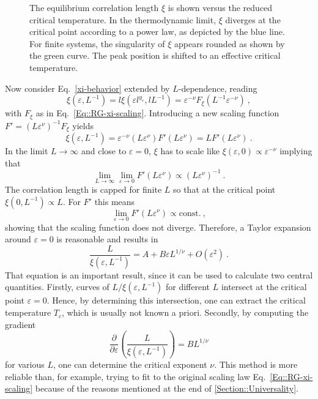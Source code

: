 	\begin{figure}
		\centering
		
		\caption{The equilibrium correlation length $\xi$ is shown versus the reduced critical temperature. In the thermodynamic limit, $\xi$ diverges at the critical point according to a power law, as depicted by the blue line. For finite systems, the singularity of $\xi$ appears rounded as shown by the green curve. The peak position is shifted to an effective critical temperature.}
		\label{xi-divergence-FS}
	\end{figure}
	Now consider Eq.~\eqref{xi-behavior} extended by $L$-dependence, reading
	\begin{equation}
		\xi(\varepsilon, L^{-1}) =	l \xi (\varepsilon l^{y_\varepsilon}, l L^{-1}) = \varepsilon^{-\nu} F_\xi (L^{-1} \varepsilon^{-\nu})~,
	\end{equation}
	with $F_\xi$ as in Eq.~\eqref{Eq::RG-xi-scaling}. Introducing a new scaling function $F' =	(L \varepsilon^\nu)^{-1} F_\xi$ yields
	\begin{equation}
		\xi(\varepsilon, L^{-1}) = \varepsilon^{-\nu} (L\varepsilon^\nu) F' (L \varepsilon^{\nu}) =	L	F'(L \varepsilon^\nu)~.
	\end{equation}
	In the limit $L \rightarrow \infty$ and close to $\varepsilon =	0$, $\xi$ has to scale like $\xi(\varepsilon, 0) \propto \varepsilon^{-\nu}$ implying that
	\begin{equation}
		\lim_{L \rightarrow \infty} \lim_{\varepsilon \rightarrow 0} F'(L \varepsilon^\nu) \propto (L \varepsilon^\nu)^{-1}~.
	\end{equation}
	The correlation length is capped for finite $L$ so that at the critical point $\xi(0, L^{-1}) \propto L$. For $F'$ this means
	\begin{equation}
		\lim_{\varepsilon \rightarrow 0} F'(L\varepsilon^\nu) \propto \text{const.}~,
	\end{equation}
	showing that the scaling function does not diverge. Therefore, a Taylor expansion around $\varepsilon =	0$ is reasonable and results in
	\begin{equation} \label{Equation::FSS-Scaling-L/xi}
		\frac{L}{\xi(\varepsilon, L^{-1})} =	A + B \varepsilon L^{1/\nu} + O(\varepsilon^2)~. 
	\end{equation}
	That equation is an important result, since it can be used to calculate two central quantities. Firstly, curves of $L/\xi(\varepsilon, L^{-1})$ for different $L$ intersect at the critical point $\varepsilon = 0$. Hence, by determining this intersection, one can extract the critical temperature $T_c$, which is usually not known a priori. Secondly, by computing the gradient
	\begin{equation}
		\frac{\partial}{\partial \varepsilon} \left(\frac{L}{\xi(\varepsilon, L^{-1})}\right) =	B L^{1/\nu}
	\end{equation}
	for various $L$, one can determine the critical exponent $\nu$. This method is more reliable than, for example, trying to fit to the original scaling law Eq.~\eqref{Eq::RG-xi-scaling} because of the reasons mentioned at the end of \autoref{Section::Universality}.
